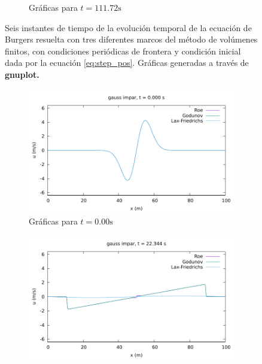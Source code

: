 \documentclass[12pt]{article}
\begin{document}
\begin{figure}[h!]
\begin{subfigure}{0.49\textwidth}
			\caption*{Gráficas para $t=111.72\unit{\second}$}
			\label{fig:step_pos-perio6}
		\end{subfigure}
		\caption{Seis instantes de tiempo de la evolución temporal de  la ecuación de Burgers resuelta con tres diferentes marcos del método de volúmenes finitos, con condiciones periódicas de frontera y condición inicial dada por la ecuación \ref{eq:step_pos}. Gráficas generadas a través de \textbf{gnuplot.}}
		\label{fig:step_pos-periodica}
	\end{figure}

	\begin{figure}[h!]
		\centering
		\begin{subfigure}{0.49\textwidth}
			\centering
			\includegraphics[width=\textwidth]{../burgers1DVF/results/sol_periodicas/gauss_impar/000.pdf}
			\caption*{Gráficas para $t=0.00\unit{\second}$}
			\label{fig:gauss_impar-perio1}
		\end{subfigure}\hfill
		\begin{subfigure}{0.49\textwidth}
			\centering
			\includegraphics[width=\textwidth]{../burgers1DVF/results/sol_periodicas/gauss_impar/021.pdf}

\end{subfigure}
\end{figure}
\end{document}
